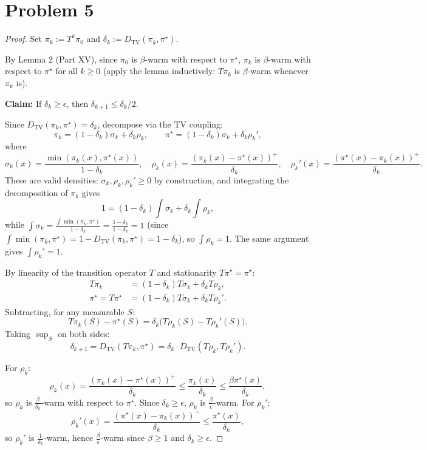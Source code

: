 \section*{Problem 5}
\begin{proof}
Set $\pi_k := T^k \pi_0$ and $\delta_k := D_{\mathrm{TV}}(\pi_k, \pi^\star)$.

By Lemma 2 (Part XV), since $\pi_0$ is $\beta$-warm with respect to $\pi^\star$, $\pi_k$ is $\beta$-warm with respect to $\pi^\star$ for all $k \ge 0$ (apply the lemma inductively: $T\pi_k$ is $\beta$-warm whenever $\pi_k$ is).

\textbf{Claim:} If $\delta_k \ge \epsilon$, then $\delta_{k+1} \le \delta_k / 2$.

Since $D_{\mathrm{TV}}(\pi_k, \pi^\star) = \delta_k$, decompose via the TV coupling:
\[
\pi_k = (1 - \delta_k)\sigma_k + \delta_k \rho_k, \qquad \pi^\star = (1 - \delta_k)\sigma_k + \delta_k \rho_k',
\]
where
\[
\sigma_k(x) = \frac{\min(\pi_k(x), \pi^\star(x))}{1 - \delta_k}, \quad \rho_k(x) = \frac{(\pi_k(x) - \pi^\star(x))^+}{\delta_k}, \quad \rho_k'(x) = \frac{(\pi^\star(x) - \pi_k(x))^+}{\delta_k}.
\]
These are valid densities: $\sigma_k, \rho_k, \rho_k' \ge 0$ by construction, and integrating the decomposition of $\pi_k$ gives
\[
1 = (1 - \delta_k)\int \sigma_k + \delta_k \int \rho_k,
\]
while $\int \sigma_k = \frac{\int \min(\pi_k, \pi^\star)}{1 - \delta_k} = \frac{1 - \delta_k}{1 - \delta_k} = 1$ (since $\int \min(\pi_k, \pi^\star) = 1 - D_{\mathrm{TV}}(\pi_k, \pi^\star) = 1 - \delta_k$), so $\int \rho_k = 1$. The same argument gives $\int \rho_k' = 1$.

By linearity of the transition operator $T$ and stationarity $T\pi^\star = \pi^\star$:
\begin{align*}
T\pi_k &= (1 - \delta_k) T\sigma_k + \delta_k T\rho_k, \\
\pi^\star = T\pi^\star &= (1 - \delta_k) T\sigma_k + \delta_k T\rho_k'.
\end{align*}
Subtracting, for any measurable $S$:
\[
T\pi_k(S) - \pi^\star(S) = \delta_k \bigl(T\rho_k(S) - T\rho_k'(S)\bigr).
\]
Taking $\sup_S$ on both sides:
\[
\delta_{k+1} = D_{\mathrm{TV}}(T\pi_k, \pi^\star) = \delta_k \cdot D_{\mathrm{TV}}(T\rho_k, T\rho_k').
\]

For $\rho_k$:
\[
\rho_k(x) = \frac{(\pi_k(x) - \pi^\star(x))^+}{\delta_k} \le \frac{\pi_k(x)}{\delta_k} \le \frac{\beta \pi^\star(x)}{\delta_k},
\]
so $\rho_k$ is $\frac{\beta}{\delta_k}$-warm with respect to $\pi^\star$. Since $\delta_k \ge \epsilon$, $\rho_k$ is $\frac{\beta}{\epsilon}$-warm. For $\rho_k'$:
\[
\rho_k'(x) = \frac{(\pi^\star(x) - \pi_k(x))^+}{\delta_k} \le \frac{\pi^\star(x)}{\delta_k},
\]
so $\rho_k'$ is $\frac{1}{\delta_k}$-warm, hence $\frac{\beta}{\epsilon}$-warm since $\beta \ge 1$ and $\delta_k \ge \epsilon$.


\end{proof}
